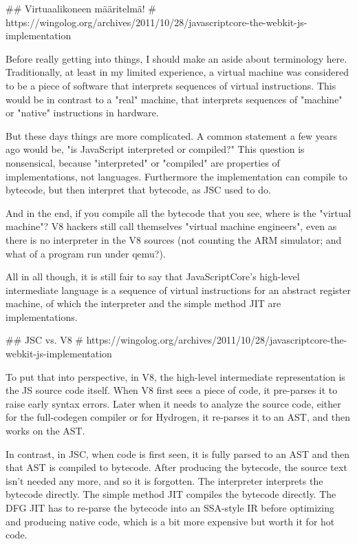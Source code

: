 ## Virtuaalikoneen määritelmä!
# https://wingolog.org/archives/2011/10/28/javascriptcore-the-webkit-js-implementation

Before really getting into things, I should make an aside about terminology here. Traditionally, at least in my limited experience, a virtual machine was considered to be a piece of software that interprets sequences of virtual instructions. This would be in contrast to a "real" machine, that interprets sequences of "machine" or "native" instructions in hardware.

But these days things are more complicated. A common statement a few years ago would be, "is JavaScript interpreted or compiled?" This question is nonsensical, because "interpreted" or "compiled" are properties of implementations, not languages. Furthermore the implementation can compile to bytecode, but then interpret that bytecode, as JSC used to do.

And in the end, if you compile all the bytecode that you see, where is the "virtual machine"? V8 hackers still call themselves "virtual machine engineers", even as there is no interpreter in the V8 sources (not counting the ARM simulator; and what of a program run under qemu?).

All in all though, it is still fair to say that JavaScriptCore's high-level intermediate language is a sequence of virtual instructions for an abstract register machine, of which the interpreter and the simple method JIT are implementations.

## JSC vs. V8
# https://wingolog.org/archives/2011/10/28/javascriptcore-the-webkit-js-implementation

To put that into perspective, in V8, the high-level intermediate representation is the JS source code itself. When V8 first sees a piece of code, it pre-parses it to raise early syntax errors. Later when it needs to analyze the source code, either for the full-codegen compiler or for Hydrogen, it re-parses it to an AST, and then works on the AST.

In contrast, in JSC, when code is first seen, it is fully parsed to an AST and then that AST is compiled to bytecode. After producing the bytecode, the source text isn't needed any more, and so it is forgotten. The interpreter interprets the bytecode directly. The simple method JIT compiles the bytecode directly. The DFG JIT has to re-parse the bytecode into an SSA-style IR before optimizing and producing native code, which is a bit more expensive but worth it for hot code.

